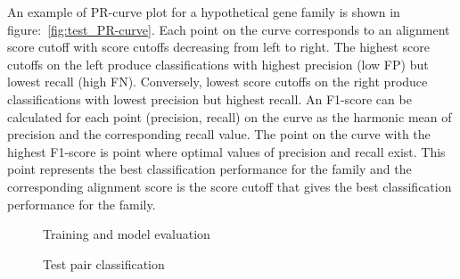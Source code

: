 \documentclass{article}
\begin{document}
			An example of PR-curve plot for a hypothetical gene family is shown in figure:~\ref{fig:test_PR-curve}. Each point on the curve corresponds to an alignment score cutoff with score cutoffs decreasing from left to right. The highest score cutoffs on the left produce classifications with highest precision (low FP) but lowest recall (high FN). Conversely, lowest score cutoffs on the right produce classifications with lowest precision but highest recall. An F1-score can be calculated for each point (precision, recall) on the curve as the harmonic mean of precision and the corresponding recall value. The point on the curve with the highest F1-score is point where optimal values of precision and recall exist. This point represents the best classification performance for the family and the corresponding alignment score is the score cutoff that gives the best classification performance for the family.
			
			\begin{figure}
				\caption{Training and model evaluation}
				\label{fig:train_classify1}
			\end{figure}
			
			\begin{figure}
				\caption{Test pair classification}
				\label{fig:train_classify2}
			\end{figure}
			
\end{document}
